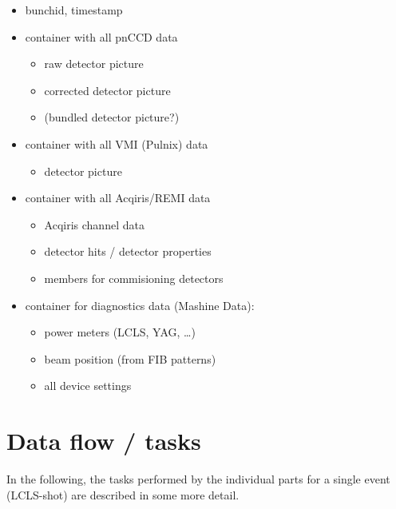 \documentclass[11pt,a4paper,oneside]{article}
\begin{document}
\begin{itemize}
\item bunchid, timestamp
\item container with all pnCCD data
	\begin{itemize}
	\item raw detector picture
	\item corrected detector picture
	\item (bundled detector picture?)
	\end{itemize}
\item container with all VMI (Pulnix) data
	\begin{itemize}
	\item detector picture
	\end{itemize}
\item container with all Acqiris/REMI data
	\begin{itemize}
	\item Acqiris channel data
	\item detector hits / detector properties
	\item members for commisioning detectors
	\end{itemize}
\item container for diagnostics data (Mashine Data):
   \begin{itemize}
   \item power meters (LCLS, YAG, \dots )
   \item beam position (from FIB patterns)
   \item all device settings
   \end{itemize}
\end{itemize}



\section{Data flow / tasks}
\label{sec:tasks}

In the following, the tasks performed by the individual parts for a single event (LCLS-shot) are described in some more detail.
\end{document}
